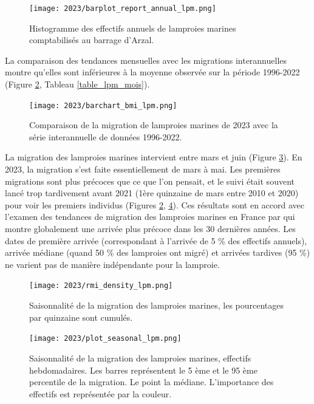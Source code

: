 \documentclass[11pt,twocolumn,titlepage,twoside]{article}\usepackage[]{graphicx}\usepackage[]{color}
\begin{document}
		
\begin{figure}[htpb]
\centering
\texttt{[image: 2023/barplot\_report\_annual\_lpm.png]} 
\caption{Histogramme des effectifs annuels de lamproies marines comptabilisés
au barrage d'Arzal.}
\label{barplot_report_annual_lpm}
\end{figure}


La comparaison des tendances mensuelles avec les migrations
interannuelles montre qu'elles sont inférieures à la moyenne observée sur la
période 1996-2022 (Figure \ref{barchart_bmi_lpm}, Tableau
\ref{table_lpm_mois}).

\begin{figure}[htpb]
\centering
\texttt{[image: 2023/barchart\_bmi\_lpm.png]} 
\caption{Comparaison de la migration de lamproies marines de 2023 avec la
série interannuelle de données 1996-2022.}
\label{barchart_bmi_lpm}
\end{figure}





La migration des lamproies marines intervient entre mars et juin (Figure
\ref{rmi_density_lpm}). En 2023, la migration s'est faite essentiellement
de mars à mai. Les premières migrations sont plus précoces que ce que l'on pensait,
et le suivi était souvent lancé trop tardivement avant 2021 
(1ère quinzaine de mars entre 2010 et 2020) pour voir les premiers individus
(Figures \ref{barchart_bmi_lpm}, \ref{plot_seasonal_lpm}).
Ces résultats sont en accord avec l'examen des tendances de migration des
lamproies marines en France par \citet{legrandContrastingTrendsSpecies2020} qui
montre globalement une arrivée plus précoce dans les 30 dernières années. 
Les dates de première arrivée (correspondant à l'arrivée de 5 \% des
effectifs annuels), arrivée médiane (quand 50 \% des lamproies ont migré) et
arrivées tardives (95 \%) ne varient pas de manière indépendante pour la
lamproie. 

\begin{figure}[htpb]
\centering
\texttt{[image: 2023/rmi\_density\_lpm.png]} 
\caption{Saisonnalité de la migration des lamproies marines, les pourcentages
par quinzaine sont cumulés.}
\label{rmi_density_lpm}
\end{figure}


\begin{figure}[htpb]
\centering
\texttt{[image: 2023/plot\_seasonal\_lpm.png]} 
\caption{Saisonnalité de la migration des lamproies marines, effectifs
hebdomadaires. Les
barres représentent le 5 ème et le 95 ème percentile de la migration. Le
point la médiane. L'importance des effectifs est représentée par la couleur.}
\label{plot_seasonal_lpm}
\end{figure}
\end{document}
